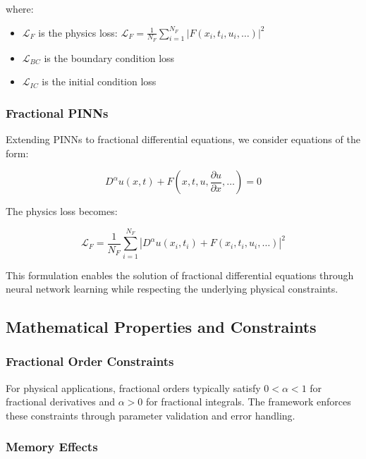 where:
\begin{itemize}
    \item $\mathcal{L}_F$ is the physics loss: $\mathcal{L}_F = \frac{1}{N_F} \sum_{i=1}^{N_F} |F(x_i, t_i, u_i, \ldots)|^2$
    \item $\mathcal{L}_{BC}$ is the boundary condition loss
    \item $\mathcal{L}_{IC}$ is the initial condition loss
\end{itemize}

\subsubsection{Fractional PINNs}

Extending PINNs to fractional differential equations, we consider equations of the form:

\begin{equation}
D^{\alpha} u(x,t) + F(x, t, u, \frac{\partial u}{\partial x}, \ldots) = 0
\end{equation}

The physics loss becomes:

\begin{equation}
\mathcal{L}_F = \frac{1}{N_F} \sum_{i=1}^{N_F} |D^{\alpha} u(x_i, t_i) + F(x_i, t_i, u_i, \ldots)|^2
\end{equation}

This formulation enables the solution of fractional differential equations through neural network learning while respecting the underlying physical constraints.

\subsection{Mathematical Properties and Constraints}

\subsubsection{Fractional Order Constraints}

For physical applications, fractional orders typically satisfy $0 < \alpha < 1$ for fractional derivatives and $\alpha > 0$ for fractional integrals. The framework enforces these constraints through parameter validation and error handling.

\subsubsection{Memory Effects}

